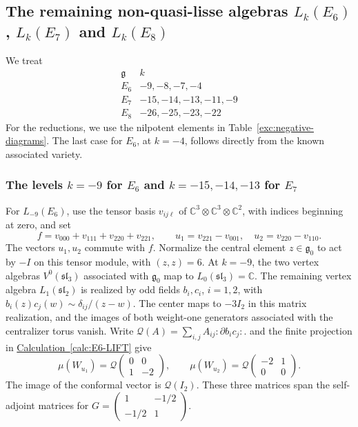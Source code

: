 \documentclass[11pt,a4paper]{amsart}
\numberwithin{equation}{section}
\theoremstyle{definition}
\theoremstyle{remark}
\newcommand{\C}{\mathbb C}
\newcommand{\g}{\mathfrak g}
\newcommand{\slg}{\mathfrak{sl}}
\begin{document}
\subsection{\texorpdfstring{The remaining non-quasi-lisse algebras $L_k(E_6)$, $L_k(E_7)$ and $L_k(E_8)$}{The remaining non-quasi-lisse algebras Lk(E6), Lk(E7) and Lk(E8)}}
We treat
$$
 \begin{array}{c|l}
 \g&k\\\hline
 E_6&-9,-8,-7,-4\\
 E_7&-15,-14,-13,-11,-9\\
 E_8&-26,-25,-23,-22
 \end{array}
$$
For the reductions, we use the nilpotent elements in
Table~\ref{exc:negative-diagrams}. The last case for $E_6$, at $k=-4$,
follows directly from the known associated variety.
\subsubsection{\texorpdfstring{The levels $k=-9$ for $E_6$ and $k=-15,-14,-13$ for $E_7$}{The levels k=-9 for E6 and k=-15,-14,-13 for E7}}
For $L_{-9}(E_6)$, use the tensor basis $v_{ij\ell}$ of
$\C^3\otimes\C^3\otimes\C^2$, with indices beginning at zero, and set
$$
 f=v_{000}+v_{111}+v_{220}+v_{221},\qquad
 u_1=v_{221}-v_{001},\quad u_2=v_{220}-v_{110}.
$$
The vectors $u_1,u_2$ commute with $f$. Normalize the central element
$z\in\g_0$ to act by $-I$ on this tensor module, with $(z,z)=6$.
At $k=-9$, the two vertex algebras $V^0(\slg_3)$ associated with
$\g_0$ map to $L_0(\slg_3)=\C$. The remaining vertex algebra
$L_1(\slg_2)$ is realized by odd fields $b_i,c_i$, $i=1,2$, with
$b_i(z)c_j(w)\sim\delta_{ij}/(z-w)$. The center maps to
$-3I_2$ in this matrix realization, and the images of both weight-one
generators associated with the centralizer torus vanish. Write
$\mathcal Q(A)=\sum_{i,j}A_{ij}:\partial b_i c_j:$.
 and the finite projection in
\hyperref[calc:E6-LIFT]{Calculation~\ref*{calc:E6-LIFT}} give
$$
 \mu(W_{u_1})=\mathcal Q\!\begin{pmatrix}0&0\\1&-2\end{pmatrix},\qquad
 \mu(W_{u_2})=\mathcal Q\!\begin{pmatrix}-2&1\\0&0\end{pmatrix}.
$$
The image of the conformal vector is $\mathcal Q(I_2)$. These three matrices span
the self-adjoint matrices for
$G=\left(\begin{smallmatrix}1&-1/2\\-1/2&1\end{smallmatrix}\right)$.
\end{document}
